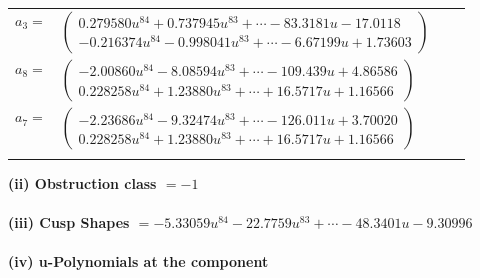 \documentclass[1p]{elsarticle_modified}
\theoremstyle{definition}
\begin{document}
\begin{tabular}{m{7pt} m{180pt} m{7pt} m{180pt} }
\flushright $a_{3}=$&$\begin{pmatrix}0.279580 u^{84}+0.737945 u^{83}+\cdots-83.3181 u-17.0118\\-0.216374 u^{84}-0.998041 u^{83}+\cdots-6.67199 u+1.73603\end{pmatrix}$ \\
\flushright $a_{8}=$&$\begin{pmatrix}-2.00860 u^{84}-8.08594 u^{83}+\cdots-109.439 u+4.86586\\0.228258 u^{84}+1.23880 u^{83}+\cdots+16.5717 u+1.16566\end{pmatrix}$ \\
\flushright $a_{7}=$&$\begin{pmatrix}-2.23686 u^{84}-9.32474 u^{83}+\cdots-126.011 u+3.70020\\0.228258 u^{84}+1.23880 u^{83}+\cdots+16.5717 u+1.16566\end{pmatrix}$\\&\end{tabular}
\flushleft \textbf{(ii) Obstruction class $= -1$}\\~\\
\flushleft \textbf{(iii) Cusp Shapes $= -5.33059 u^{84}-22.7759 u^{83}+\cdots-48.3401 u-9.30996$}\\~\\
\newpage\renewcommand{\arraystretch}{1}
\flushleft \textbf{(iv) u-Polynomials at the component}\newline \\
\end{document}
